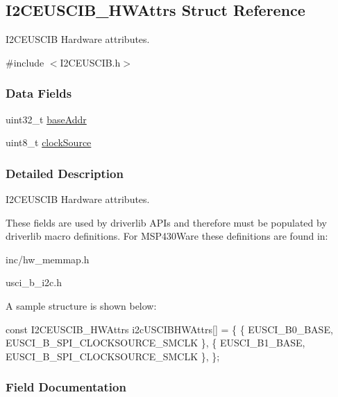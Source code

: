\subsection{I2\+C\+E\+U\+S\+C\+I\+B\+\_\+\+H\+W\+Attrs Struct Reference}
\label{struct_i2_c_e_u_s_c_i_b___h_w_attrs}


I2\+C\+E\+U\+S\+C\+I\+B Hardware attributes.  




{\ttfamily \#include $<$I2\+C\+E\+U\+S\+C\+I\+B.\+h$>$}

\subsubsection*{Data Fields}
\begin{DoxyCompactItemize}
\item 
uint32\+\_\+t \hyperlink{struct_i2_c_e_u_s_c_i_b___h_w_attrs_ac629f3dec6ed52e4f6696c301000c0ac}{base\+Addr}
\item 
uint8\+\_\+t \hyperlink{struct_i2_c_e_u_s_c_i_b___h_w_attrs_ae90808e5895254b06d72a2c83f4f0987}{clock\+Source}
\end{DoxyCompactItemize}


\subsubsection{Detailed Description}
I2\+C\+E\+U\+S\+C\+I\+B Hardware attributes. 

These fields are used by driverlib A\+P\+Is and therefore must be populated by driverlib macro definitions. For M\+S\+P430\+Ware these definitions are found in\+:
\begin{DoxyItemize}
\item inc/hw\+\_\+memmap.\+h
\item usci\+\_\+b\+\_\+i2c.\+h
\end{DoxyItemize}

A sample structure is shown below\+: 
\begin{DoxyCode}
\textcolor{keyword}{const} I2CEUSCIB_HWAttrs i2cUSCIBHWAttrs[] = \{
    \{
        EUSCI\_B0\_BASE,
        EUSCI\_B\_SPI\_CLOCKSOURCE\_SMCLK
    \},
    \{
        EUSCI\_B1\_BASE,
        EUSCI\_B\_SPI\_CLOCKSOURCE\_SMCLK
    \},
\};
\end{DoxyCode}
 

\subsubsection{Field Documentation}
